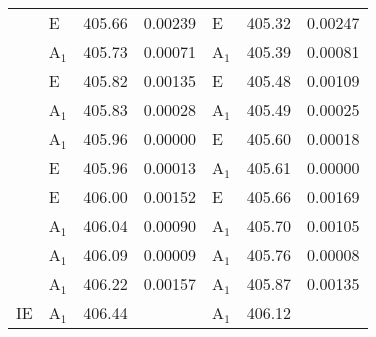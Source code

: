 \documentclass[journal=jctcce,manuscript=article]{achemso}
\begin{document}
\begin{table}[H]
\begin{tabular}{l|lcc|lcc}
& E     & 405.66 & 0.00239 & E     & 405.32 & 0.00247 \\
& A$_1$ & 405.73 & 0.00071 & A$_1$ & 405.39 & 0.00081 \\
& E     & 405.82 & 0.00135 & E     & 405.48 & 0.00109 \\
& A$_1$ & 405.83 & 0.00028 & A$_1$ & 405.49 & 0.00025 \\
& A$_1$ & 405.96 & 0.00000 & E     & 405.60 & 0.00018 \\
& E     & 405.96 & 0.00013 & A$_1$ & 405.61 & 0.00000 \\
& E     & 406.00 & 0.00152 & E     & 405.66 & 0.00169 \\
& A$_1$ & 406.04 & 0.00090 & A$_1$ & 405.70 & 0.00105 \\
& A$_1$ & 406.09 & 0.00009 & A$_1$ & 405.76 & 0.00008 \\
& A$_1$ & 406.22 & 0.00157 & A$_1$ & 405.87 & 0.00135 \\
\hline  
IE & A$_1$ & 406.44& 
   & A$_1$ & 406.12&  \\
\hline
\end{tabular}\\
\end{table}
\end{document}
